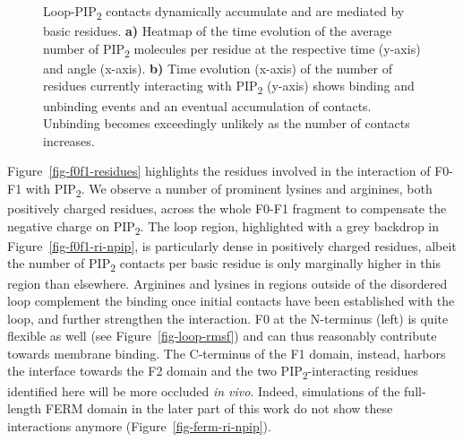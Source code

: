 \documentclass[
  twocolumn]{biophys-new-mod}
\begin{document}
\begin{figure}
\begin{minipage}[t]{\linewidth}
{{}

}

\subcaption{\label{fig-f0f1-retention}~}
\end{minipage}%

\caption{\label{fig-loop-importance-2}Loop-PIP\textsubscript{2}
contacts dynamically accumulate and are mediated by basic residues. \textbf{a)} Heatmap
of the time evolution of the average number of PIP\textsubscript{2}
molecules per residue at the respective time (y-axis) and angle
(x-axis). \textbf{b)} Time evolution (x-axis) of the number of residues
currently interacting with PIP\textsubscript{2} (y-axis) shows binding
and unbinding events and an eventual accumulation of contacts. Unbinding
becomes exceedingly unlikely as the number of contacts increases.}

\end{figure}

Figure~\ref{fig-f0f1-residues} highlights the residues involved in the
interaction of F0-F1 with PIP\textsubscript{2}. We observe a number of prominent lysines and arginines,
both positively charged residues, across the whole F0-F1 fragment to compensate the negative charge on
PIP\textsubscript{2}. The loop region, highlighted with a grey backdrop
in Figure~\ref{fig-f0f1-ri-npip}, is particularly dense in positively
charged residues, albeit the number of PIP\textsubscript{2} contacts per basic residue is only marginally higher in this region than elsewhere. Arginines and lysines in regions outside of the disordered loop complement the binding once initial
contacts have been established with the loop, and further strengthen the interaction.
F0 at the N-terminus (left) is quite flexible as well (see
Figure~\ref{fig-loop-rmsf}) and can thus reasonably contribute towards
membrane binding. The C-terminus of the F1 domain, instead, harbors the interface towards the F2 domain and the two PIP\textsubscript{2}-interacting residues identified here will be
more occluded \emph{in vivo}. Indeed, simulations of the full-length
FERM domain in the later part of this work do not show these interactions
anymore (Figure~\ref{fig-ferm-ri-npip}).
\end{document}

